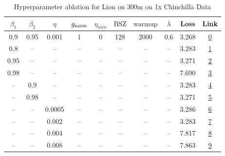 \begin{table}[H]
\centering
\caption{Hyperparameter ablation for Lion on 300m on 1x Chinchilla Data}
\label{tab:ablation_lion_300m_on_1x_chinchilla_data}
\begin{tabular}{cccccccccc}
\toprule
$\beta_1$ & $\beta_2$ & $\eta$ & $g_{\mathrm{norm}}$ & $\eta_{min}$ & $\mathrm{BSZ}$ & $\mathrm{warmup}$ & $\lambda$ & Loss & Link \\
\midrule
0.9 & 0.95 & 0.001 & 1 & 0 & 128 & 2000 & 0.6 & 3.268 & \href{https://wandb.ai/marin-community/optimizer-scaling/runs/sweep-300m-6B-lion00979clr0.001-wd0.6-minlr0-warmup2000-b10.9-b2-81fdf3}{0} \\
\midrule
0.8 & -- & -- & -- & -- & -- & -- & -- & 3.283 & \href{https://wandb.ai/marin-community/optimizer-scaling/runs/sweep-300m-6B-lionb6c8celr0.001-wd0.6-minlr0-warmup2000-b10.8-b2-b954bf}{1} \\
0.95 & -- & -- & -- & -- & -- & -- & -- & 3.271 & \href{https://wandb.ai/marin-community/optimizer-scaling/runs/sweep-300m-6B-lion11c981lr0.001-wd0.6-minlr0-warmup2000-b10.95-b-4fef8e}{2} \\
0.98 & -- & -- & -- & -- & -- & -- & -- & 7.690 & \href{https://wandb.ai/marin-community/optimizer-scaling/runs/sweep-300m-6B-lion5c8de5lr0.001-wd0.6-minlr0-warmup2000-b10.98-b-1d6304}{3} \\
-- & 0.9 & -- & -- & -- & -- & -- & -- & 3.283 & \href{https://wandb.ai/marin-community/optimizer-scaling/runs/sweep-300m-6B-lionf81910lr0.001-wd0.6-minlr0-warmup2000-b10.9-b2-3a8ce5}{4} \\
-- & 0.98 & -- & -- & -- & -- & -- & -- & 3.271 & \href{https://wandb.ai/marin-community/optimizer-scaling/runs/sweep-300m-6B-lion062393lr0.001-wd0.6-minlr0-warmup2000-b10.9-b2-aaa1ff}{5} \\
-- & -- & 0.0005 & -- & -- & -- & -- & -- & 3.286 & \href{https://wandb.ai/marin-community/optimizer-scaling/runs/sweep-300m-6B-lionfb90dflr0.0005-wd0.6-minlr0-warmup2000-b10.9-b-8dee1b}{6} \\
-- & -- & 0.002 & -- & -- & -- & -- & -- & 3.283 & \href{https://wandb.ai/marin-community/optimizer-scaling/runs/sweep-300m-6B-lion009506lr0.002-wd0.6-minlr0-warmup2000-b10.9-b2-9aa797}{7} \\
-- & -- & 0.004 & -- & -- & -- & -- & -- & 7.817 & \href{https://wandb.ai/marin-community/optimizer-scaling/runs/sweep-300m-6B-lionfef5c5lr0.004-wd0.6-minlr0-warmup2000-b10.9-b2-2cf0da}{8} \\
-- & -- & 0.008 & -- & -- & -- & -- & -- & 7.863 & \href{https://wandb.ai/marin-community/optimizer-scaling/runs/sweep-300m-6B-lion617912lr0.008-wd0.6-minlr0-warmup2000-b10.9-b2-9c49d8}{9} \\

\end{tabular}
\end{table}
